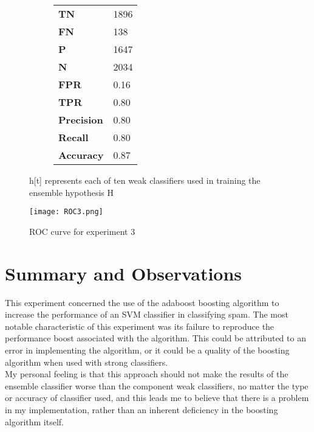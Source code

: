 \documentclass[titlepage,11pt]{article}
\begin{document}
{\begin{figure}[h]
\begin{subfigure}[h]{0.3\textwidth}
\begin{tabular}{|l|l|}
        \textbf{ TN } & 1896 \\
        \textbf{ FN } & 138 \\
        \textbf{ P } &  1647 \\
        \textbf{ N } & 2034 \\
        \textbf{ FPR } & 0.16 \\
        \textbf{ TPR } & 0.80 \\
        \hline
        \textbf{ Precision } & 0.80\\
        \textbf{ Recall    } & 0.80\\
        \textbf{ Accuracy  } & 0.87\\
        \hline
        \end{tabular}
    \end{subfigure}
    \caption{h[t] represents each of ten weak classifiers used in training the ensemble hypothesis H}
\end{figure}
\pagebreak
\begin{figure}[h]
\centering
    \texttt{[image: ROC3.png]}
    \caption{ROC curve for experiment 3}
\end{figure}
}

\section[7]{Summary and Observations} {
\vspace{2pt} \hspace{2pt}This experiment concerned the use of the adaboost boosting algorithm to increase the performance of an SVM classifier in classifying spam. The most notable characteristic of this experiment was its failure to reproduce the performance boost associated with the algorithm. This could be attributed to an error in implementing the algorithm, or it could be a quality of the boosting algorithm when used with strong classifiers.\\
\vspace{2pt} \hspace{2pt}My personal feeling is that this approach should not make the results of the ensemble classifier worse than the component weak classifiers, no matter the type or accuracy of classifier used, and this leads me to believe that there is a problem in my implementation, rather than an inherent deficiency in the boosting algorithm itself.
}
\end{document}
